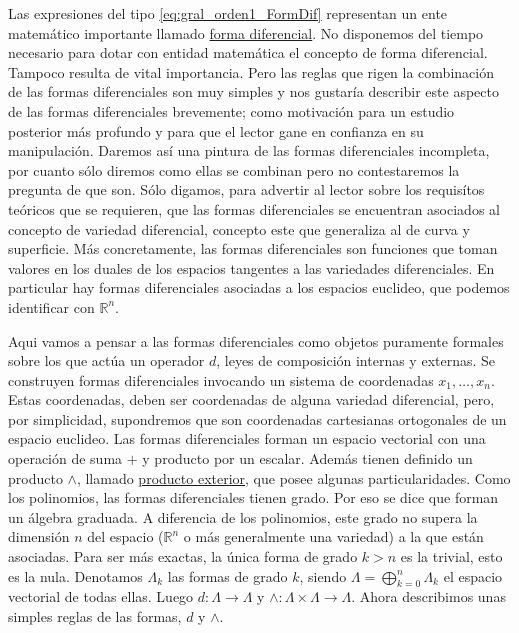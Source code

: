 \documentclass{article}
\newcommand{\rr}{\mathbb{R}}
\begin{document}
 Las expresiones del tipo \eqref{eq:gral_orden1_FormDif} representan un ente matemático importante llamado \href{http://es.wikipedia.org/wiki/Forma_diferencial}{forma diferencial}. No disponemos del tiempo necesario para dotar con entidad matemática el concepto de forma diferencial. Tampoco  resulta de vital importancia. Pero las reglas que rigen la combinación de las formas diferenciales son muy simples y nos gustaría describir este aspecto de las formas diferenciales brevemente; como motivación para un estudio posterior más profundo y para que el lector gane en confianza en su manipulación. Daremos así una pintura de las formas diferenciales incompleta, por cuanto sólo diremos como ellas se combinan pero no contestaremos la pregunta de que son. Sólo digamos, para advertir al lector sobre los requisítos teóricos que se requieren, que las formas diferenciales se encuentran asociados al concepto de variedad diferencial, concepto este que generaliza al de curva y superficie.  Más 
concretamente, las formas diferenciales son funciones que toman valores en los duales de los espacios tangentes a las variedades diferenciales. En particular hay formas diferenciales asociadas a los espacios euclideo, que podemos identificar con  $\rr^n$.

Aqui vamos a pensar a las formas diferenciales como objetos puramente formales sobre los que actúa un operador $d$, leyes de composición internas y externas. Se construyen formas diferenciales invocando un sistema de coordenadas $x_1,\ldots,x_n$. Estas coordenadas, deben ser coordenadas de alguna variedad diferencial, pero, por simplicidad, supondremos que son coordenadas cartesianas ortogonales de un espacio euclideo. Las formas diferenciales forman un espacio vectorial con una operación de suma $+$ y producto por un escalar. Además tienen definido un producto $\wedge$, llamado \href{https://es.wikipedia.org/wiki/Producto_exterior}{producto exterior}, que posee  algunas particularidades.  Como los polinomios, las formas diferenciales tienen grado. Por eso se dice que forman un álgebra graduada. A diferencia de los polinomios, este grado no supera la dimensión $n$ del espacio ($\rr^n$ o más generalmente una variedad) a la que están asociadas. Para ser más exactas, la única forma de 
grado $k>n$ es la trivial, esto es la nula. Denotamos $\Lambda_k$ las formas de grado $k$, siendo $\Lambda =\bigoplus_{k=0}^{n}\Lambda_k$ el espacio vectorial de todas ellas. Luego $d:\Lambda\to\Lambda$ y $\wedge:\Lambda\times\Lambda\to \Lambda$. Ahora describimos unas simples reglas de las formas,  $d$ y $\wedge$.
\end{document}
